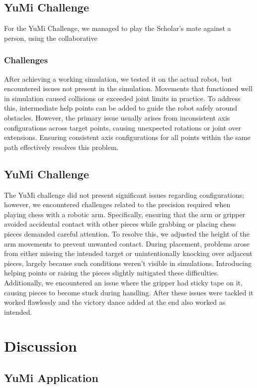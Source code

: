 \documentclass[a4paper,12pt]{article}
\begin{document}
\subsection{YuMi Challenge}
For the YuMi Challenge, we managed to play the Scholar's mate against a person, using the collaborative 
\subsubsection{Challenges}

After achieving a working simulation, we tested it on the actual robot, but encountered issues not present in the simulation. Movements that functioned well in simulation caused collisions or exceeded joint limits in practice. To address this, intermediate help points can be added to guide the robot safely around obstacles. However, the primary issue usually arises from inconsistent axis configurations across target points, causing unexpected rotations or joint over extensions. Ensuring consistent axis configurations for all points within the same path effectively resolves this problem.

\subsection{YuMi Challenge}
The YuMi challenge did not present significant issues regarding configurations; however, we encountered challenges related to the precision required when playing chess with a robotic arm. Specifically, ensuring that the arm or gripper avoided accidental contact with other pieces while grabbing or placing chess pieces demanded careful attention. To resolve this, we adjusted the height of the arm movements to prevent unwanted contact. During placement, problems arose from either missing the intended target or unintentionally knocking over adjacent pieces, largely because such conditions weren't visible in simulations. Introducing helping points or raising the pieces slightly mitigated these difficulties.
Additionally, we encountered an issue where the gripper had sticky tape on it, causing pieces to become stuck during handling. 
After these issues were tackled it worked flawlessly and the victory dance added at the end also worked as intended.

\section{Discussion}
\subsection{YuMi Application}
\end{document}
